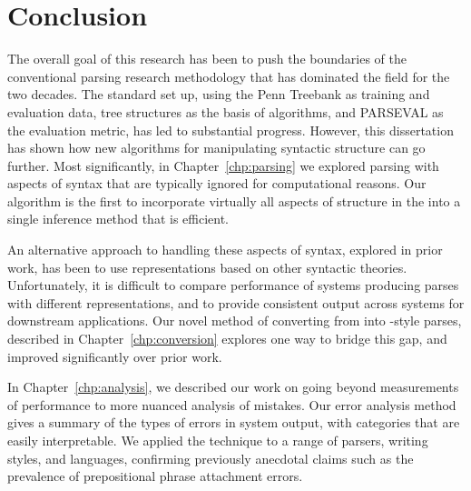 \chapter{Conclusion}

The overall goal of this research has been to push the boundaries of the conventional parsing research methodology that has dominated the field for the two decades.
The standard set up, using the Penn Treebank as training and evaluation data, tree structures as the basis of algorithms, and PARSEVAL as the evaluation metric, has led to substantial progress.
However, this dissertation has shown how new algorithms for manipulating syntactic structure can go further.
Most significantly, in Chapter~\ref{chp:parsing} we explored parsing with aspects of syntax that are typically ignored for computational reasons.
Our algorithm is the first to incorporate virtually all aspects of structure in the \ptb into a single inference method that is efficient.

An alternative approach to handling these aspects of syntax, explored in prior work, has been to use representations based on other syntactic theories.
Unfortunately, it is difficult to compare performance of systems producing parses with different representations, and to provide consistent output across systems for downstream applications.
Our novel method of converting from \ccg into \ptb-style parses, described in Chapter~\ref{chp:conversion} explores one way to bridge this gap, and improved significantly over prior work.

In Chapter~\ref{chp:analysis}, we described our work on going beyond measurements of performance to more nuanced analysis of mistakes.
Our error analysis method gives a summary of the types of errors in system output, with categories that are easily interpretable.
We applied the technique to a range of parsers, writing styles, and languages, confirming previously anecdotal claims such as the prevalence of prepositional phrase attachment errors.

